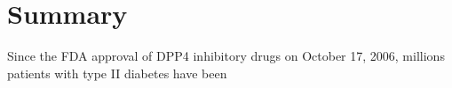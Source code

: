 \section{\label{chap:Sum} Summary}
Since the FDA approval of DPP4 inhibitory drugs on October 17, 2006, millions patients with type II diabetes have been 
